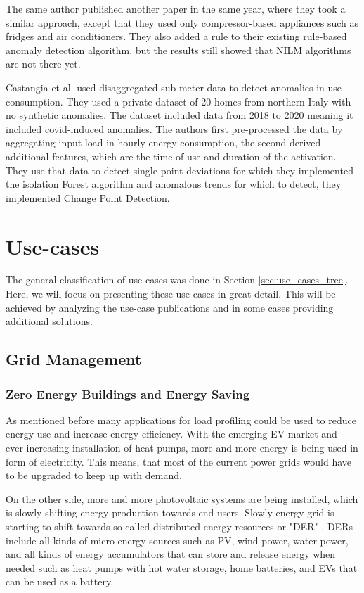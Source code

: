 The same author \cite{NILMAD22019} published another paper in the same year, where they took a similar approach, except that they used 
only compressor-based appliances such as fridges and air conditioners. They also added a rule to their existing rule-based anomaly 
detection algorithm, but the results still showed that NILM algorithms are not there yet. 

Castangia et al.\cite{Castangia2021} used disaggregated sub-meter data to detect anomalies in use consumption.
They used a private dataset of 20 homes from northern Italy with no synthetic anomalies. 
The dataset included data from 2018 to 2020 meaning it included covid-induced anomalies. 
The authors first pre-processed the data by aggregating input load in hourly energy consumption, 
the second derived additional features, which are the time of use and duration of the activation.
They use that data to detect single-point deviations for which they implemented the isolation Forest algorithm and
anomalous trends for which to detect, they implemented Change Point Detection. 

\section{Use-cases}
\label{sec:use-cases}

The general classification of use-cases was done in Section \ref{sec:use_cases_tree}. 
Here, we will focus on presenting these use-cases in great detail.
This will be achieved by analyzing the use-case publications and in some cases providing additional solutions.

\subsection{Grid Management}
\label{sec:grid_managment}
\subsubsection{Zero Energy Buildings and Energy Saving}

As mentioned before many applications for load profiling could be used to reduce energy use and increase energy efficiency. 
With the emerging EV-market and ever-increasing installation of heat pumps, more and more energy is being used in form of electricity. 
This means, that most of the current power grids would have to be upgraded to keep up with demand.

On the other side, more and more photovoltaic systems are being installed,
which is slowly shifting energy production towards end-users.
Slowly energy grid is starting to shift towards so-called distributed energy resources or "DER" \cite{MORENOJARAMILLO2021445}.
DERs include all kinds of micro-energy sources such as PV, wind power, water power, and all kinds of energy accumulators that can store 
and release energy when needed such as heat pumps with hot water storage, home batteries, and EVs that can be used as a battery.


